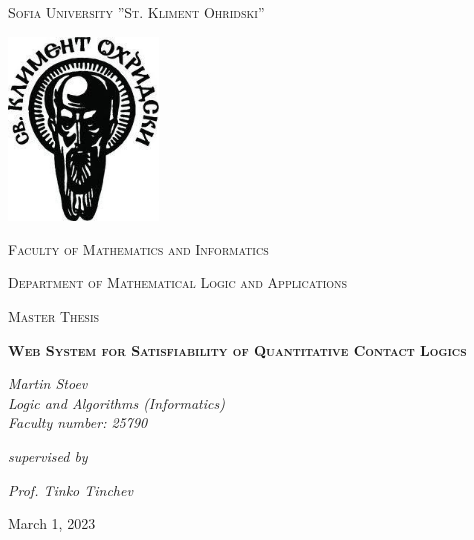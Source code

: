 \documentclass{article}
\begin{document}
\begin{titlepage}
    \begin{center}
	\LARGE
       \textsc{Sofia University ”St. Kliment Ohridski”}

        \vspace{0.5cm}
       \includegraphics[width=4cm]{su_logo}

        \vspace{0.5cm}
       \Large
       \textsc{Faculty of Mathematics and Informatics}

	 \textsc{Department of Mathematical Logic and Applications}
            
        \vspace{0.5cm}
        \vfill
        \large
        \textsc{Master Thesis}
            
        \vspace{0.6cm}
            
        \vfill
	\huge
       \textsc{\textbf{Web System for Satisfiability of Quantitative Contact Logics}}
            
            
        \vspace{0.8cm}
            
        \vfill
	\large
 	\textit{Martin Stoev} \\
	\textit{Logic and Algorithms (Informatics)}\\
 	\textit{Faculty number: 25790}

        \vfill
	\textit{supervised by}

	\textit{Prof. Tinko Tinchev}

        \vspace{0.8cm}
	March 1, 2023

    \end{center}
\end{titlepage}

	
 	\thispagestyle{empty}
	\newpage

	\tableofcontents

	\newpage
\end{document}
